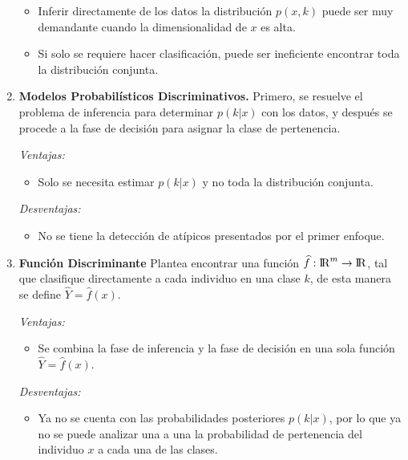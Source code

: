 \begin{enumerate}
\begin{itemize}
\item Inferir directamente de los datos la distribución $p(x,k)$ puede ser muy demandante cuando la dimensionalidad de $x$ es alta. 

\item Si solo se requiere hacer clasificación, puede ser ineficiente encontrar toda la distribución conjunta.
\end{itemize}


\item \textbf{Modelos Probabilísticos Discriminativos.}
Primero, se resuelve el problema de inferencia para determinar $p(k|x)$ con los datos, y después se procede a la fase de decisión para asignar la clase de pertenencia.

\textit{Ventajas:\cite{bishop2006pattern}}
\begin{itemize}
\item Solo se necesita estimar $p(k|x)$ y no toda la distribución conjunta.
\end{itemize}

\textit{Desventajas:\cite{bishop2006pattern}}
\begin{itemize}
\item No se tiene la detección de atípicos presentados por el primer enfoque.
\end{itemize}


\item \textbf{Función Discriminante}
Plantea encontrar una función $\widehat{f}:{\rm I\!R}^m \rightarrow {\rm I\!R}$, tal que clasifique directamente a cada individuo en una clase $k$, de esta manera se define $\widehat{Y}=\widehat{f}(x)$. 

\textit{Ventajas:\cite{bishop2006pattern}}
\begin{itemize}
\item Se combina la fase de inferencia y la fase de decisión en una sola función $\widehat{Y}=\widehat{f}(x)$. 
\end{itemize}

\textit{Desventajas:\cite{bishop2006pattern}}
\begin{itemize}
\item Ya no se cuenta con las probabilidades posteriores $p(k|x)$, por lo que ya no se puede analizar una a una la probabilidad de pertenencia del individuo $x$ a cada una de las clases.
\end{itemize}

\end{enumerate}


